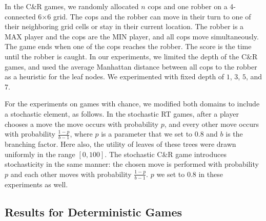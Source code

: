\documentclass[runningheads]{llncs}
\newcommand{\vmax}{v_{\text{max}}}
\newcommand{\vmin}{v_{\text{min}}}
\begin{document}
In the C\&R games, we randomly allocated $n$ cops and one robber on a 4-connected 6$\times$6 grid. The cops and the robber can move in their turn to one of their neighboring grid cells or stay in their current location. The robber is a MAX player and the cops are the MIN player, and all cops move simultaneously. The game ends when one of the cops reaches the robber. The score is the time until the robber is caught. 
In our experiments, we limited the depth of the C\&R games, and used the average Manhattan distance between all cops to the robber as a heuristic for the leaf nodes. We experimented with fixed depth of $1$, $3$, $5$, and $7$.


For the experiments on games with chance, we modified both domains to include a stochastic element, as follows. In the stochastic RT games, after a player chooses a move the move occurs with probability $p$, and every other move occurs with probability $\frac{1-p}{b-1}$, where $p$ is a parameter that we set to $0.8$ and $b$ is the branching factor. Here also, the utility of leaves of these trees were drawn uniformly in the range $[0, 100]$. %
The stochastic C\&R game introduces stochasticity in the same manner: the chosen move is performed with probability $p$ and each other moves with probability $\frac{1-p}{b-1}$. $p$ we set to 0.8 in these experiments as well. 



\subsection{Results for Deterministic Games}

\end{document}
